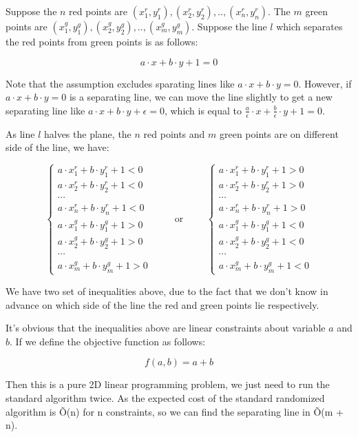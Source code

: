 
Suppose the $n$ red points are $(x_1^r, y_1^r), (x_2^r, y_2^r), .., (x_n^r, y_n^r)$. The $m$ green points are $(x_1^g, y_1^g), (x_2^g, y_2^g), .., (x_m^g, y_m^g)$. Suppose the line $l$ which separates the red points from green points is as follows:

\[
  a \cdot x + b \cdot y + 1 = 0
\]

Note that the assumption excludes sparating lines like $a \cdot x + b \cdot y = 0$. However, if $a \cdot x + b \cdot y = 0$ is a separating line, we can move the line slightly to get a new separating line like $a \cdot x + b \cdot y + \epsilon = 0$, which is equal to $\frac{a}{\epsilon} \cdot x + \frac{b}{\epsilon} \cdot y + 1 = 0$.

As line $l$ halves the plane, the $n$ red points and $m$ green points are on different side of the line, we have:

\[
  \left\{
      \begin{array}{l}
          a \cdot x_1^r + b \cdot y_1^r + 1 < 0 \\
          a \cdot x_2^r + b \cdot y_2^r + 1 < 0 \\
          \cdots \\
          a \cdot x_n^r + b \cdot y_n^r + 1 < 0 \\
          a \cdot x_1^g + b \cdot y_1^g + 1 > 0 \\
          a \cdot x_2^g + b \cdot y_2^g + 1 > 0 \\
          \cdots \\
          a \cdot x_m^g + b \cdot y_m^g + 1 > 0
      \end{array}
  \right.
  \hspace{1cm}\text{or}\hspace{1cm}
  \left\{
      \begin{array}{l}
          a \cdot x_1^r + b \cdot y_1^r + 1 > 0 \\
          a \cdot x_2^r + b \cdot y_2^r + 1 > 0 \\
          \cdots \\
          a \cdot x_n^r + b \cdot y_n^r + 1 > 0 \\
          a \cdot x_1^g + b \cdot y_1^g + 1 < 0 \\
          a \cdot x_2^g + b \cdot y_2^g + 1 < 0 \\
          \cdots \\
          a \cdot x_m^g + b \cdot y_m^g + 1 < 0
      \end{array}
  \right.
\]

We have two set of inequalities above, due to the fact that we don't know in advance on which side of the line the red and green points lie respectively.

It's obvious that the inequalities above are linear constraints about variable $a$ and $b$. If we define the objective function as follows:

\[
  f(a, b) = a + b
\]

Then this is a pure 2D linear programming problem, we just need to run the standard algorithm twice. As the expected cost of the standard randomized algorithm is \~O(n) for n constraints, so we can find the separating line in \~O(m + n).